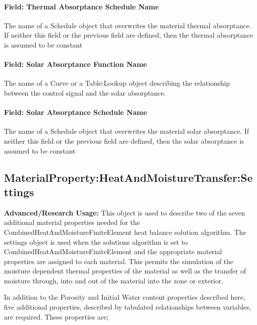\paragraph{Field: Thermal Absorptance Schedule Name}\label{field-thermal-absorptance-schedule-name}

The name of a Schedule object that overwrites the material thermal absorptance.
If neither this field or the previous field are defined, then the thermal absorptance is assumed to be constant

\paragraph{Field: Solar Absorptance Function Name}\label{field-solar-absorptance-function-name}

The name of a Curve or a Table:Lookup object describing the relationship between the control signal and the solar absorptance.

\paragraph{Field: Solar Absorptance Schedule Name}\label{field-solar-absorptance-schedule-name}

The name of a Schedule object that overwrites the material solar absorptance.
If neither this field or the previous field are defined, then the solar absorptance is assumed to be constant

\subsection{MaterialProperty:HeatAndMoistureTransfer:Settings}\label{materialpropertyheatandmoisturetransfersettings}

\textbf{Advanced/Research Usage:} This object is used to describe two of the seven additional material properties needed for the CombinedHeatAndMoistureFiniteElement heat balance solution algorithm. The settings object is used when the solutions algorithm is set to CombinedHeatAndMoistureFiniteElement and the appropriate material properties are assigned to each material. This permits the simulation of the moisture dependent thermal properties of the material as well as the transfer of moisture through, into and out of the material into the zone or exterior.

In addition to the Porosity and Initial Water content properties described here, five additional properties, described by tabulated relationships between variables, are required. These properties are;

